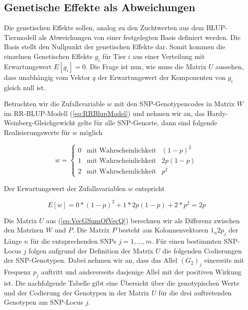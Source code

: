 \documentclass[]{book}
\begin{document}
\subsection{Genetische Effekte als
Abweichungen}\label{genetische-effekte-als-abweichungen}

Die genetischen Effekte sollen, analog zu den Zuchtwerten aus dem
BLUP-Tiermodell als Abweichungen von einer festgelegten Basis definiert
werden. Die Basis stellt den Nullpunkt der genetischen Effekte dar.
Somit kommen die einzelnen Genetischen Effekte \(g_i\) für Tier \(i\)
aus einer Verteilung mit Erwartungswert \(E\left[g_i\right] = 0\). Die
Frage ist nun, wie muss die Matrix \(U\) aussehen, dass unabhängig vom
Vektor \(q\) der Erwartungswert der Komponenten von \(g_i\) gleich null
ist.

Betrachten wir die Zufallsvariable \(w\) mit den SNP-Genotypencodes in
Matrix \(W\) im RR-BLUP-Modell (\ref{eq:RRBlupModel}) und nehmen wir an,
das Hardy-Weinberg-Gleichgewicht gelte für alle SNP-Genorte, dann sind
folgende Realisierungswerte für \(w\) möglich

\begin{equation}
w = \left\{ \begin{array}{lll}
0  &  \text{mit Wahrscheinlichkeit} & (1-p)^2\\
1  &  \text{mit Wahrscheinlichkeit} & 2p(1-p) \\
2  &  \text{mit Wahrscheinlichkeit} & p^2
\end{array}
\right.
\label{eq:RandVarGenotypesW}
\end{equation}

Der Erwartungswert der Zufallsvariablen \(w\) entspricht

\begin{equation}
E\left[w\right] = 0*(1-p)^2 + 1 * 2p(1-p) + 2 * p^2 = 2p
\label{eq:ExpectedValueW}
\end{equation}

Die Matrix \(U\) aus (\ref{eq:VecGSumOfVecQ}) berechnen wir als
Differenz zwischen den Matrizen \(W\) und \(P\). Die Matrix \(P\)
besteht aus Kolonnenvektoren \(1_n2p_j\) der Länge \(n\) für die
entsprechenden SNPs \(j = 1,\ldots ,m\). Für einen bestimmten SNP-Locus
\(j\) folgen aufgrund der Definition der Matrix \(U\) die folgenden
Codierungen der SNP-Genotypen. Dabei nehmen wir an, dass das Allel
\((G_{2})_j\) einerseits mit Frequenz \(p_j\) auftritt und andererseits
dasjenige Allel mit der positiven Wirkung ist. Die nachfolgende Tabelle
gibt eine Übersicht über die genotypischen Werte und der Codierung der
Genotypen in der Matrix \(U\) für die drei auftretenden Genotypen am
SNP-Locus \(j\).
\end{document}
